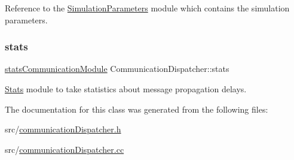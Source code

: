 Reference to the \hyperlink{class_simulation_parameters}{Simulation\+Parameters} module which contains the simulation parameters. 

\mbox{\label{class_communication_dispatcher_a5e01e95460682f3a31417efab24b25e4}} 
\subsubsection{\texorpdfstring{stats}{stats}}
{\footnotesize\ttfamily \hyperlink{communication_dispatcher_8h_a9d0242025c5ba7fecd1b0c41f4777c06}{stats\+Communication\+Module} Communication\+Dispatcher\+::stats\hspace{0.3cm}{\ttfamily [private]}}



\hyperlink{class_stats}{Stats} module to take statistics about message propagation delays. 



The documentation for this class was generated from the following files\+:\begin{DoxyCompactItemize}
\item 
src/\hyperlink{communication_dispatcher_8h}{communication\+Dispatcher.\+h}\item 
src/\hyperlink{communication_dispatcher_8cc}{communication\+Dispatcher.\+cc}\end{DoxyCompactItemize}
